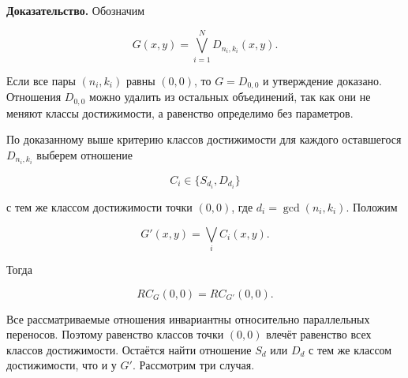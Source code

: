 \textbf{Доказательство.} Обозначим

$$G(x,y)=\bigvee\limits_{i=1}^{N}D_{n_i,k_i}(x,y).$$

Если все пары $(n_i,k_i)$ равны $(0,0)$, то $G=D_{0,0}$ и утверждение
доказано. Отношения $D_{0,0}$ можно удалить из остальных объединений, так как
они не меняют классы достижимости, а равенство определимо без параметров.

По доказанному выше критерию классов достижимости для каждого оставшегося
$D_{n_i,k_i}$ выберем отношение

$$C_i\in\{S_{d_i},D_{d_i}\}$$

с тем же классом достижимости точки $(0,0)$, где
$d_i=\gcd(n_i,k_i)$. Положим

$$G'(x,y)=\bigvee\limits_i C_i(x,y).$$

Тогда

$$RC_G(0,0)=RC_{G'}(0,0).$$

Все рассматриваемые отношения инвариантны относительно параллельных
переносов. Поэтому равенство классов точки $(0,0)$ влечёт равенство всех
классов достижимости. Остаётся найти отношение $S_d$ или $D_d$ с тем же
классом достижимости, что и у $G'$. Рассмотрим три случая.

